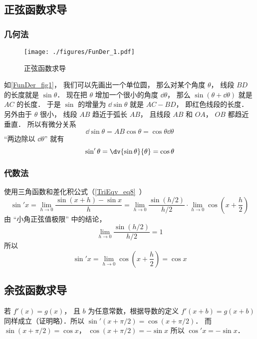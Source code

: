 \subsection{正弦函数求导}
\subsubsection{几何法}
\begin{figure}[ht]
\centering
\texttt{[image: ./figures/FunDer\_1.pdf]}
\caption{正弦函数求导} \label{FunDer_fig1}
\end{figure}
如\autoref{FunDer_fig1}， 我们可以先画出一个单位圆， 那么对某个角度 $\theta$， 线段 $BD$ 的长度就是 $\sin\theta$． 现在把 $\theta$ 增加一个很小的角度 $\dd{\theta}$， 那么 $\sin(\theta+\dd{\theta})$ 就是 $AC$ 的长度． 于是 $\sin$ 的增量为 $\dd{\sin\theta}$ 就是 $AC - BD$， 即红色线段的长度． 另外由于 $\theta$ 很小， 线段 $AB$ 趋近于弧长 $AB$， 且线段 $AB$ 和 $OA$， $OB$ 都趋近垂直． 所以有微分关系
\begin{equation}
\dd{\sin\theta} = AB \cos\theta = \cos\theta \dd{\theta}
\end{equation}
“两边除以 $\dd{\theta}$” 就有
\begin{equation}
\sin'\theta = \dv{\sin\theta}{\theta} = \cos\theta
\end{equation}

\subsubsection{代数法}
使用三角函数和差化积公式（\autoref{TriEqv_eq8}~）
\begin{equation}
\sin'x = \lim_{h \to 0} \frac{\sin (x + h) - \sin x}{h} = \lim_{h \to 0} \frac{\sin (h/2)}{h/2} \cdot \lim_{h \to 0}\cos( x + \frac{h}{2})
\end{equation}
由 “小角正弦值极限” 中的结论，
\begin{equation}
\lim_{h \to 0} \frac{\sin (h/2)}{h/2} = 1
\end{equation}
所以
\begin{equation}
\sin'x =  \lim_{h \to 0}\cos( x + \frac{h}{2}) = \cos x
\end{equation}

\subsection{余弦函数求导}
若 $f'(x) = g(x)$， 且 $b$ 为任意常数，根据导数的定义 $f'(x + b) = g(x + b)$ 同样成立（证明略）．所以 $\sin'(x + \pi/2) = \cos(x + \pi/2)$． 而 $\sin(x + \pi/2) = \cos x$，  $\cos(x + \pi/2) =  - \sin x$ 所以 $\cos' x =  - \sin x$．

